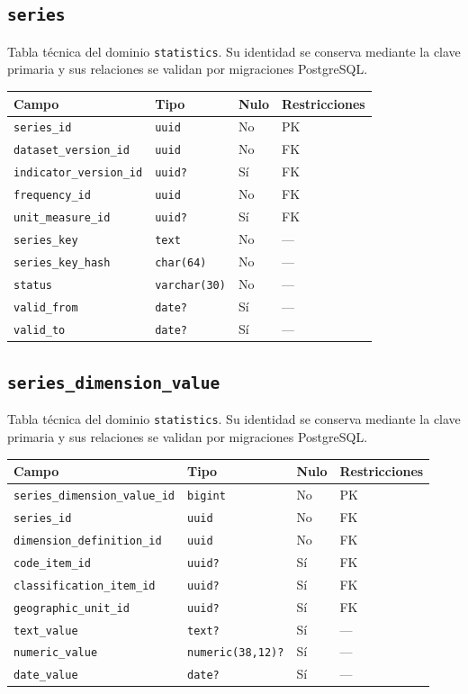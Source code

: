 \documentclass[11pt]{article}
\begin{document}
\subsection{\texttt{series}}
Tabla técnica del dominio \texttt{statistics}. Su identidad se conserva mediante la clave primaria y sus relaciones se validan por migraciones PostgreSQL.
\begin{longtable}{>{\raggedright\arraybackslash}p{} p{} p{} p{}}
\toprule Campo & Tipo & Nulo & Restricciones \\ \midrule\endhead
\texttt{series\_id} & \texttt{uuid} & No & PK \\
\texttt{dataset\_version\_id} & \texttt{uuid} & No & FK \\
\texttt{indicator\_version\_id} & \texttt{uuid?} & Sí & FK \\
\texttt{frequency\_id} & \texttt{uuid} & No & FK \\
\texttt{unit\_measure\_id} & \texttt{uuid?} & Sí & FK \\
\texttt{series\_key} & \texttt{text} & No & --- \\
\texttt{series\_key\_hash} & \texttt{char(64)} & No & --- \\
\texttt{status} & \texttt{varchar(30)} & No & --- \\
\texttt{valid\_from} & \texttt{date?} & Sí & --- \\
\texttt{valid\_to} & \texttt{date?} & Sí & --- \\
\bottomrule\end{longtable}
\subsection{\texttt{series\_dimension\_value}}
Tabla técnica del dominio \texttt{statistics}. Su identidad se conserva mediante la clave primaria y sus relaciones se validan por migraciones PostgreSQL.
\begin{longtable}{>{\raggedright\arraybackslash}p{} p{} p{} p{}}
\toprule Campo & Tipo & Nulo & Restricciones \\ \midrule\endhead
\texttt{series\_dimension\_value\_id} & \texttt{bigint} & No & PK \\
\texttt{series\_id} & \texttt{uuid} & No & FK \\
\texttt{dimension\_definition\_id} & \texttt{uuid} & No & FK \\
\texttt{code\_item\_id} & \texttt{uuid?} & Sí & FK \\
\texttt{classification\_item\_id} & \texttt{uuid?} & Sí & FK \\
\texttt{geographic\_unit\_id} & \texttt{uuid?} & Sí & FK \\
\texttt{text\_value} & \texttt{text?} & Sí & --- \\
\texttt{numeric\_value} & \texttt{numeric(38,12)?} & Sí & --- \\
\texttt{date\_value} & \texttt{date?} & Sí & --- \\
\bottomrule\end{longtable}
\end{document}
